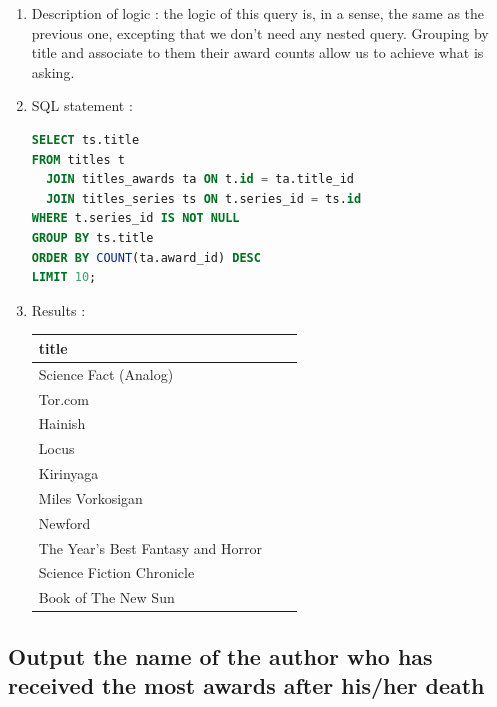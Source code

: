 \documentclass[doubleside, titlepage]{article}
\begin{document}
		\begin{enumerate}
	\item Description of logic : the logic of this query is, in a sense, the same as the previous one, excepting that we don't need any nested query. Grouping by title and associate to them their award counts allow us to achieve what is asking.
	\item SQL statement :
		\begin{lstlisting}[language=SQL,showspaces=false,basicstyle=\ttfamily,numberstyle=\tiny,commentstyle=\color{gray}]
SELECT ts.title
FROM titles t
  JOIN titles_awards ta ON t.id = ta.title_id
  JOIN titles_series ts ON t.series_id = ts.id
WHERE t.series_id IS NOT NULL
GROUP BY ts.title
ORDER BY COUNT(ta.award_id) DESC
LIMIT 10;
		\end{lstlisting}

	\item Results :\\

	\begin{tabular}{|l|c|r|}
  \hline
  title \\
  \hline
Science Fact (Analog) \\
Tor.com \\
Hainish \\
Locus \\
Kirinyaga \\
Miles Vorkosigan \\
Newford \\
The Year's Best Fantasy and Horror \\
Science Fiction Chronicle \\
Book of The New Sun \\
  \hline
\end{tabular}

	\end{enumerate}

\subsection{Output the name of the author who has received the most awards after his/her death}
\end{document}
